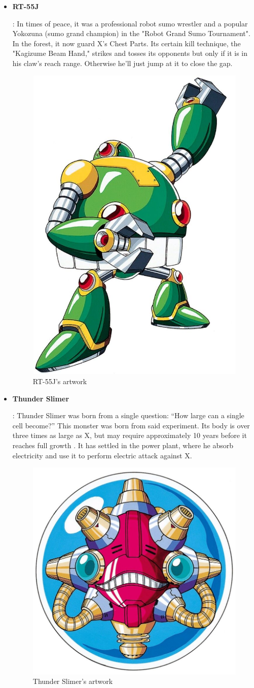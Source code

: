 \begin{itemize}
		\item \hypertarget{miniboss:RT-55J}{\textbf{RT-55J}}: In times of peace, it was a professional robot sumo wrestler and a popular Yokozuna (sumo grand champion) in the "Robot Grand Sumo Tournament". In the forest, it now guard X's  Chest Parts\cite{wayback:X_resources}. Its certain kill technique, the "Kagizume Beam Hand," strikes and tosses its opponents but only if it is in his claw's reach range. Otherwise he'll just jump at it to close the gap.
		\begin{figure}[htp]
			\centering
			\includegraphics[width=0.4\linewidth]{figures/X1/enemies/RT-55J.jpg}
			\caption{RT-55J's artwork}
		\end{figure}
	
		\item \hypertarget{miniboss:Thunder_Slimer}{\textbf{Thunder Slimer}}: Thunder Slimer was born from a single question: ``How large can a single cell become?'' This monster was born from said experiment. Its body is over three times as large as X, but may require approximately 10 years before it reaches full growth \cite{wayback:X_resources}. It has settled in the power plant, where he absorb electricity and use it to perform electric attack against X.
		\begin{figure}[htp]
			\centering
			\includegraphics[width=0.4\linewidth]{figures/X1/enemies/ThunderSlimer.jpg}
			\caption{Thunder Slimer's artwork}
		\end{figure}
	

\end{itemize}
